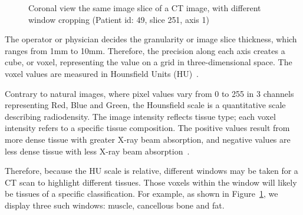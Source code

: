 \documentclass[12pt,twoside]{report}
\begin{document}
\begin{figure}[H]
    \centering
    \caption{Coronal view the same image slice of a CT image, with different window cropping (Patient id: 49, slice 251, axis 1)}
    \label{fig:ct-windows}
\end{figure}

The operator or physician decides the granularity or image slice thickness, which ranges from 1mm to 10mm. Therefore, the precision along each axis creates a cube, or voxel, representing the value on a grid in three-dimensional space. The voxel values are measured in Hounsfield Units (HU)~\cite{diagnostic-radiology-physics}. 

Contrary to natural images, where pixel values vary from 0 to 255 in 3 channels representing Red, Blue and Green, the Hounsfield scale is a quantitative scale describing radiodensity. The image intensity reflects tissue type; each voxel intensity refers to a specific tissue composition. The positive values result from more dense tissue with greater X-ray beam absorption, and negative values are less dense tissue with less X-ray beam absorption~\cite{Statpearls}.  

Therefore, because the HU scale is relative, different windows may be taken for a CT scan to highlight different tissues. Those voxels within the window will likely be tissues of a specific classification. For example, as shown in Figure~\ref{fig:ct-windows}, we display three such windows: muscle, cancellous bone and fat.
\end{document}
